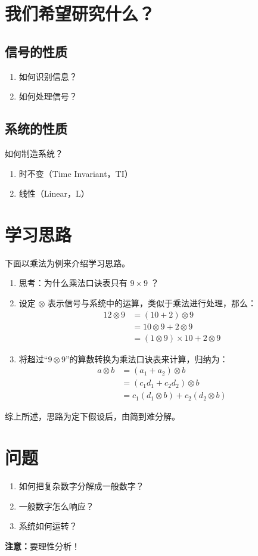 \documentclass{ctexart}
\begin{document}
\section{我们希望研究什么？}
\subsection{信号的性质}
\begin{enumerate}[itemindent=2em,label=(\arabic*)]
    \item 如何识别信息？
    \item 如何处理信号？
\end{enumerate}
\subsection{系统的性质}
如何制造系统？
\begin{enumerate}[itemindent=2em,label=(\arabic*)]
    \item 时不变（Time Invariant，TI）
    \item 线性（Linear，L）
\end{enumerate}

\section{学习思路}
下面以乘法为例来介绍学习思路。\par
\begin{enumerate}[itemindent=2em,label=(\arabic*)]
    \item 思考：为什么乘法口诀表只有 $9\times9$ ？
    \item 设定 $\otimes$ 表示信号与系统中的运算，类似于乘法进行处理，那么：
          \begin{equation}
            \begin{aligned}
                12\otimes9 &= (10+2)\otimes9 \\
                &= 10\otimes9+2\otimes9 \\
                &= (1\otimes9)\times10+2\otimes9
            \end{aligned}
          \end{equation}
    \item 将超过“$9\otimes9$”的算数转换为乘法口诀表来计算，归纳为：
          \begin{equation}
            \begin{aligned}
                a\otimes{b} &= (a_1+a_2)\otimes{b} \\
                &= (c_1d_1+c_2d_2)\otimes{b} \\
                &= c_1(d_1\otimes{b})+c_2(d_2\otimes{b})
            \end{aligned}
          \end{equation}
\end{enumerate}\par
综上所述，思路为定下假设后，由简到难分解。

\section{问题}
\begin{enumerate}[itemindent=2em,label=(\arabic*)]
    \item 如何把复杂数字分解成一般数字？
    \item 一般数字怎么响应？
    \item 系统如何运转？
\end{enumerate}\par
\textbf{注意：}要理性分析！
\end{document}
